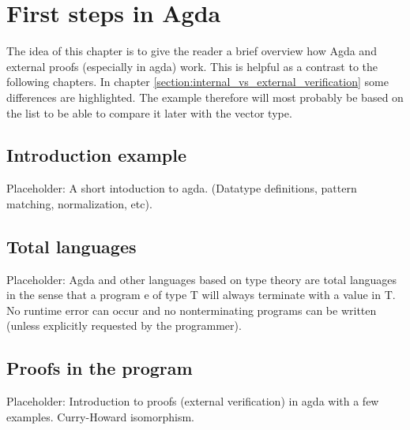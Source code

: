 \section{First steps in Agda}
The idea of this chapter is to give the reader a brief overview how Agda and external proofs (especially in agda) work. This is helpful as a contrast to the following chapters. 
In chapter \ref{section:internal_vs_external_verification} some differences are highlighted. The example therefore will most probably be based on the list to be able to compare it later with the vector type.

\subsection{Introduction example}
Placeholder: A short intoduction to agda. (Datatype definitions, pattern matching, normalization, etc).

\subsection{Total languages}
Placeholder: Agda and other languages based on type theory are total languages in the sense that a program e of type T will always terminate with a value in T. 
No runtime error can occur and no nonterminating programs can be written (unless explicitly requested by the programmer)\cite{AgdaReadTheDocs}.

\subsection{Proofs in the program}
Placeholder: Introduction to proofs (external verification) in agda with a few examples.
Curry-Howard isomorphism.
\cite{norell:deptyped, 10.1145/2841316, plfa2019}

